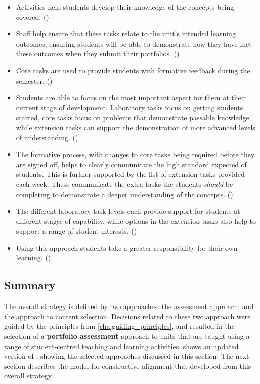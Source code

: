 \begin{itemize}[noitemsep,nolistsep]
	\item Activities help students develop their knowledge of the concepts being covered. () 
	\item Staff help ensure that these tasks relate to the unit's intended learning outcomes, ensuring students will be able to demonstrate how they have met these outcomes when they submit their portfolios. ()
	\item Core tasks are used to provide students with formative feedback during the semester. ()
	\item Students are able to focus on the most important aspect for them at their current stage of development. Laboratory tasks focus on getting students started, core tasks focus on problems that demonstrate passable knowledge, while extension tasks can support the demonstration of more advanced levels of understanding. ()
	\item The formative process, with changes to core tasks being required before they are signed off, helps to clearly communicate the high standard expected of students. This is further supported by the list of extension tasks provided each week. These communicate the extra tasks the students \emph{should} be completing to demonstrate a deeper understanding of the concepts. ()
	\item The different laboratory task levels each provide support for students at different stages of capability, while options in the extension tasks also help to support a range of student interests. ()
	\item Using this approach students take a greater responsibility for their own learning. ()
\end{itemize}


\clearpage
\subsection{Summary} %
\label{sub:summary}

The overall strategy is defined by two approaches: the assessment approach, and the approach to content selection. Decisions related to these two approach were guided by the principles from \cref{cha:guiding_principles}, and resulted in the selection of a \textbf{portfolio assessment} approach to units that are taught using a range of student-centred teaching and learning activities.  shows an updated version of , showing the selected approaches discussed in this section. The next section describes the model for constructive alignment that developed from this overall strategy.

